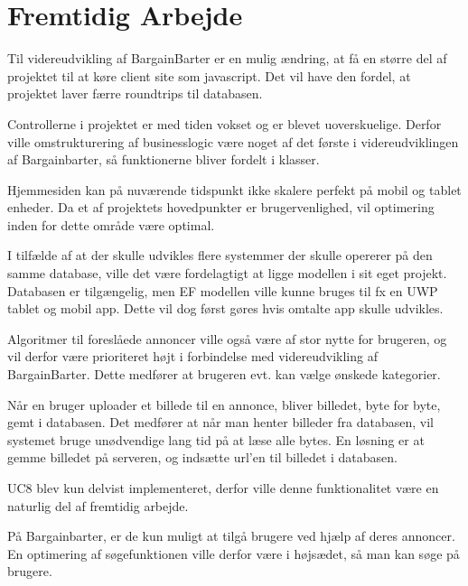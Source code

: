 \chapter{Fremtidig Arbejde}

Til videreudvikling af BargainBarter er en mulig ændring, at få en større del af projektet til at køre client site som javascript. Det vil have den fordel, at projektet laver færre roundtrips til databasen. 

\noindent Controllerne i projektet er med tiden vokset og er blevet uoverskuelige. Derfor ville omstrukturering af businesslogic være noget af det første i videreudviklingen af Bargainbarter, så funktionerne bliver fordelt i klasser. 

\noindent Hjemmesiden kan på nuværende tidspunkt ikke skalere perfekt på mobil og tablet enheder. Da et af projektets hovedpunkter er brugervenlighed, vil optimering inden for dette område være optimal.

\noindent I tilfælde af at der skulle udvikles flere systemmer der skulle opererer på den samme database, ville det være fordelagtigt at ligge modellen i sit eget projekt. Databasen er tilgængelig, men EF modellen ville kunne bruges til fx en UWP tablet og mobil app. Dette vil dog først gøres hvis omtalte app skulle udvikles. 

\noindent Algoritmer til foreslåede annoncer ville også være af stor nytte for brugeren, og vil derfor være prioriteret højt i forbindelse med videreudvikling af BargainBarter. Dette medfører at brugeren evt. kan vælge ønskede kategorier. 

\noindent Når en bruger uploader et billede til en annonce, bliver billedet, byte for byte, gemt i databasen. Det medfører at når man henter billeder fra databasen, vil systemet bruge unødvendige lang tid på at læse alle bytes. En løsning er at gemme billedet på serveren, og indsætte url'en til billedet i databasen. 

\noindent UC8 blev kun delvist implementeret, derfor ville denne funktionalitet være en naturlig del af fremtidig arbejde.

\noindent På Bargainbarter, er de kun muligt at tilgå brugere ved hjælp af deres annoncer. En optimering af søgefunktionen ville derfor være i højsædet, så man kan søge på brugere. 
 